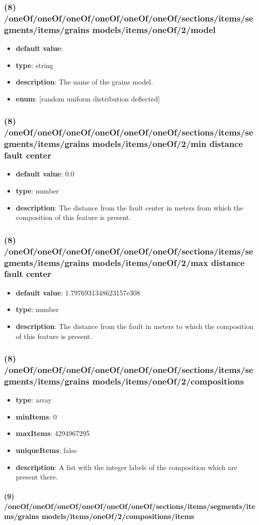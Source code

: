 \subsubsection{(8) /oneOf/oneOf/oneOf/oneOf/oneOf/oneOf/sections/items/segments/items/grains models/items/oneOf/2/model}
\begin{itemize}[leftmargin=8em]\item {\bf default value}: 
\item {\bf type}: string
\item {\bf description}: The name of the grains model.
\item {\bf enum}: [random uniform distribution deflected]\end{itemize}\subsubsection{(8) /oneOf/oneOf/oneOf/oneOf/oneOf/oneOf/sections/items/segments/items/grains models/items/oneOf/2/min distance fault center}
\begin{itemize}[leftmargin=8em]\item {\bf default value}: 0.0
\item {\bf type}: number
\item {\bf description}: The distance from the fault center in meters from which the composition of this feature is present.
\end{itemize}\subsubsection{(8) /oneOf/oneOf/oneOf/oneOf/oneOf/oneOf/sections/items/segments/items/grains models/items/oneOf/2/max distance fault center}
\begin{itemize}[leftmargin=8em]\item {\bf default value}: 1.7976931348623157e308
\item {\bf type}: number
\item {\bf description}: The distance from the fault in meters to which the composition of this feature is present.
\end{itemize}\subsubsection{(8) /oneOf/oneOf/oneOf/oneOf/oneOf/oneOf/sections/items/segments/items/grains models/items/oneOf/2/compositions}
\begin{itemize}[leftmargin=8em]\item {\bf type}: array
\item {\bf minItems}: 0
\item {\bf maxItems}: 4294967295
\item {\bf uniqueItems}: false
\item {\bf description}: A list with the integer labels of the composition which are present there.
\end{itemize}\paragraph{(9) /oneOf/oneOf/oneOf/oneOf/oneOf/oneOf/sections/items/segments/items/grains models/items/oneOf/2/compositions/items}
